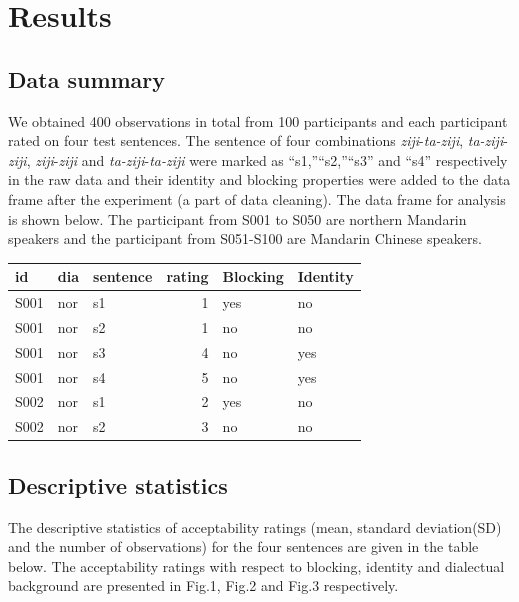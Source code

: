 \documentclass[
  english,
  man,floatsintext]{apa6}
\begin{document}
\hypertarget{results}{%
\section{Results}\label{results}}

\hypertarget{data-summary}{%
\subsection{Data summary}\label{data-summary}}

We obtained 400 observations in total from 100 participants and each participant rated on four test sentences. The sentence of four combinations \emph{ziji}-\emph{ta-ziji}, \emph{ta-ziji}-\emph{ziji}, \emph{ziji}-\emph{ziji} and \emph{ta-ziji}-\emph{ta-ziji} were marked as ``s1,''``s2,''``s3'' and ``s4'' respectively in the raw data and their identity and blocking properties were added to the data frame after the experiment (a part of data cleaning). The data frame for analysis is shown below. The participant from S001 to S050 are northern Mandarin speakers and the participant from S051-S100 are Mandarin Chinese speakers.

\begin{table}
\centering
\begin{tabular}{l|l|l|r|l|l}
\hline
id & dia & sentence & rating & Blocking & Identity\\
\hline
S001 & nor & s1 & 1 & yes & no\\
\hline
S001 & nor & s2 & 1 & no & no\\
\hline
S001 & nor & s3 & 4 & no & yes\\
\hline
S001 & nor & s4 & 5 & no & yes\\
\hline
S002 & nor & s1 & 2 & yes & no\\
\hline
S002 & nor & s2 & 3 & no & no\\
\hline
\end{tabular}
\end{table}

\hypertarget{descriptive-statistics}{%
\subsection{Descriptive statistics}\label{descriptive-statistics}}

The descriptive statistics of acceptability ratings (mean, standard deviation(SD) and the number of observations) for the four sentences are given in the table below. The acceptability ratings with respect to blocking, identity and dialectual background are presented in Fig.1, Fig.2 and Fig.3 respectively.
\end{document}
